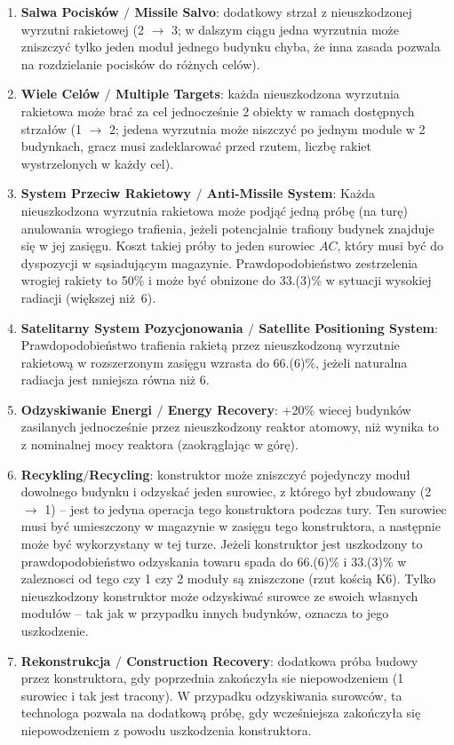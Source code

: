 \documentclass[11pt,a4paper]{article}
\begin{document}
\begin{enumerate}
\item \textbf{Salwa Pocisków $/$ Missile Salvo}: dodatkowy strzał z nieuszkodzonej wyrzutni rakietowej (2 $\to$ 3; w dalszym ciągu jedna wyrzutnia może zniszczyć tylko jeden moduł jednego budynku chyba, że inna zasada pozwala na rozdzielanie pocisków do różnych celów).
\item \textbf{Wiele Celów $/$ Multiple Targets}: każda nieuszkodzona wyrzutnia rakietowa może brać za cel jednocześnie 2 obiekty w ramach dostępnych strzałów (1 $\to$ 2; jedena wyrzutnia może niszczyć po jednym module w 2 budynkach, gracz musi zadeklarować przed rzutem, liczbę rakiet wystrzelonych w każdy cel).
\item \textbf{System Przeciw Rakietowy $/$ Anti-Missile System}: Każda nieuszkodzona wyrzutnia rakietowa może podjąć jedną próbę (na turę) anulowania wrogiego trafienia, jeżeli potencjalnie trafiony budynek znajduje się w jej zasięgu. Koszt takiej próby to jeden surowiec $AC$, który musi być do dyspozycji w sąsiadującym magazynie. Prawdopodobieństwo zestrzelenia wrogiej rakiety to 50\% i może być obnizone do 33.(3)\% w sytuacji wysokiej radiacji (większej niż~6).
\item \textbf{Satelitarny System Pozycjonowania $/$ Satellite Positioning System}: Prawdopodobieństwo trafienia rakietą przez nieuszkodzoną wyrzutnie rakietową w rozszerzonym zasięgu wzrasta do 66.(6)\%, jeżeli naturalna radiacja jest mniejsza równa niż 6.
\item \textbf{Odzyskiwanie Energi $/$ Energy Recovery}: +20\% wiecej budynków zasilanych jednocześnie przez nieuszkodzony reaktor atomowy, niż wynika to z nominalnej mocy reaktora (zaokrąglając w górę).
\item \textbf{Recykling$/$Recycling}: konstruktor może zniszczyć pojedynczy moduł dowolnego budynku i odzyskać jeden surowiec, z którego był zbudowany (2 $\to$ 1) -- jest to jedyna operacja tego konstruktora podczas tury. Ten surowiec musi być umieszczony w magazynie w zasięgu tego konstruktora, a następnie może być wykorzystany w tej turze. Jeżeli konstruktor jest uszkodzony to prawdopodobieństwo odzyskania towaru spada do 66.(6)\% i 33.(3)\% w zaleznosci od tego czy 1 czy 2 moduły są zniszczone (rzut kością K6). Tylko nieuszkodzony konstruktor może odzyskiwać surowce ze swoich własnych modułów -- tak jak w przypadku innych budynków, oznacza to jego uszkodzenie.
\item \textbf{Rekonstrukcja $/$ Construction Recovery}: dodatkowa próba budowy przez konstruktora, gdy poprzednia zakończyła sie niepowodzeniem (1 surowiec i tak jest tracony). W przypadku odzyskiwania surowców, ta technologa pozwala na dodatkową próbę, gdy wcześniejsza zakończyła się niepowodzeniem z powodu uszkodzenia konstruktora.

\end{enumerate}
\end{document}
